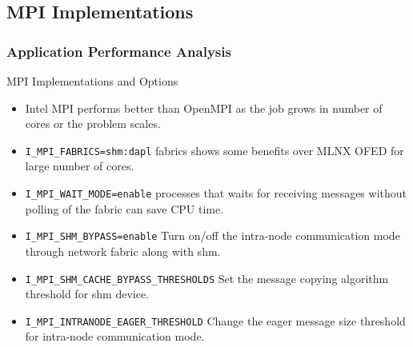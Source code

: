 \documentclass{beamer}
\begin{document}
\subsection{MPI Implementations}
\begin{frame}[fragile]
  \frametitle{Application Performance Analysis}
\begin{block}{MPI Implementations and Options}
\begin{itemize}
    \item Intel MPI performs better than OpenMPI as the job grows in number of cores or the problem scales.
    \item \verb|I_MPI_FABRICS=shm:dapl| fabrics shows some benefits over MLNX OFED for large number of cores.
    \item \verb|I_MPI_WAIT_MODE=enable| processes that waits for receiving messages without polling of the fabric can save CPU time.
    \item \verb|I_MPI_SHM_BYPASS=enable| Turn on/off the intra-node communication mode through network fabric along with shm.
    \item \verb|I_MPI_SHM_CACHE_BYPASS_THRESHOLDS| Set the message copying algorithm threshold for shm device.
    \item \verb|I_MPI_INTRANODE_EAGER_THRESHOLD| Change the eager message size threshold for intra-node communication mode.
\end{itemize}
\end{block}
\end{frame} 
\end{document}
